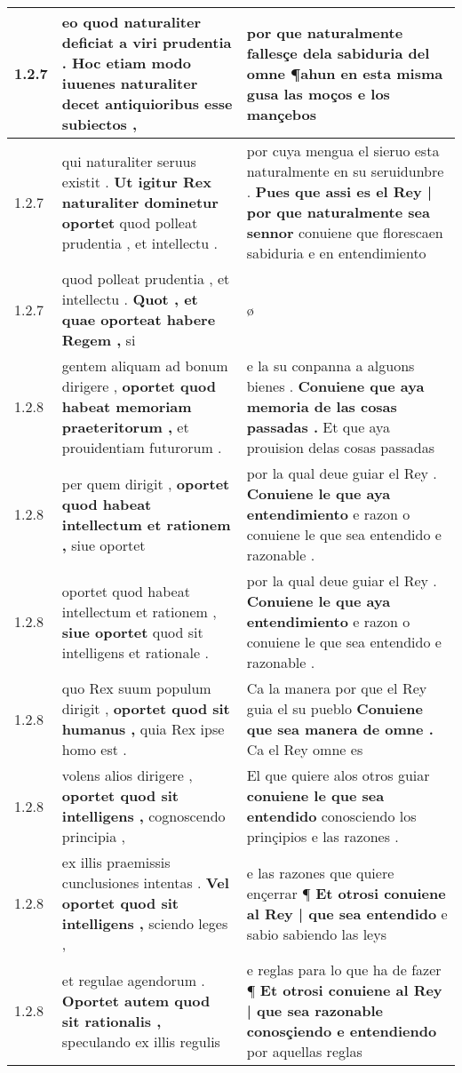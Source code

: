 \begin{tabular}{|p{1cm}|p{6.5cm}|p{6.5cm}|}
1.2.7 & eo quod naturaliter deficiat a viri prudentia . \textbf{ Hoc etiam modo iuuenes naturaliter decet } antiquioribus esse subiectos , & por que naturalmente fallesçe dela sabiduria del omne ¶ahun \textbf{ en esta misma gusa las moços } e los mançebos \\\hline
1.2.7 & qui naturaliter seruus existit . \textbf{ Ut igitur Rex naturaliter dominetur oportet } quod polleat prudentia , et intellectu . & por cuya mengua el sieruo esta naturalmente en su seruidunbre . \textbf{ Pues que assi es el Rey | por que naturalmente sea sennor } conuiene que florescaen sabiduria e en entendimiento \\\hline
1.2.7 & quod polleat prudentia , et intellectu . \textbf{ Quot , et quae oporteat habere Regem , } si & ø \\\hline
1.2.8 & gentem aliquam ad bonum dirigere , \textbf{ oportet quod habeat memoriam praeteritorum , } et prouidentiam futurorum . & e la su conpanna a alguons bienes . \textbf{ Conuiene que aya memoria de las cosas passadas . } Et que aya prouision delas cosas passadas \\\hline
1.2.8 & per quem dirigit , \textbf{ oportet quod habeat intellectum et rationem , } siue oportet & por la qual deue guiar el Rey . \textbf{ Conuiene le que aya entendimiento } e razon o conuiene le que sea entendido e razonable . \\\hline
1.2.8 & oportet quod habeat intellectum et rationem , \textbf{ siue oportet } quod sit intelligens et rationale . & por la qual deue guiar el Rey . \textbf{ Conuiene le que aya entendimiento } e razon o conuiene le que sea entendido e razonable . \\\hline
1.2.8 & quo Rex suum populum dirigit , \textbf{ oportet quod sit humanus , } quia Rex ipse homo est . & Ca la manera por que el Rey guia el su pueblo \textbf{ Conuiene que sea manera de omne . } Ca el Rey omne es \\\hline
1.2.8 & volens alios dirigere , \textbf{ oportet quod sit intelligens , } cognoscendo principia , & El que quiere alos otros guiar \textbf{ conuiene le que sea entendido } conosciendo los prinçipios e las razones . \\\hline
1.2.8 & ex illis praemissis cunclusiones intentas . \textbf{ Vel oportet quod sit intelligens , } sciendo leges , & e las razones que quiere ençerrar ¶ \textbf{ Et otrosi conuiene al Rey | que sea entendido } e sabio sabiendo las leys \\\hline
1.2.8 & et regulae agendorum . \textbf{ Oportet autem quod sit rationalis , } speculando ex illis regulis & e reglas para lo que ha de fazer ¶ \textbf{ Et otrosi conuiene al Rey | que sea razonable conosçiendo e entendiendo } por aquellas reglas \\\hline

\end{tabular}
